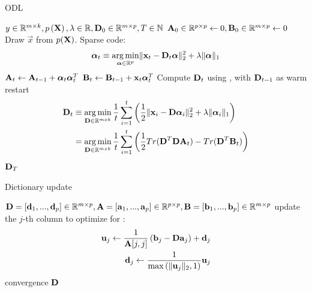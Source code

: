 \begin{algorithm}[h]
\caption{ODL}
\label{alg:trainDL}
\begin{algorithmic}[1]
\REQUIRE $y \in \mathbb{R}^{m \times k},  p \left( \boldsymbol{\mathrm{X}} \right),
\lambda \in
\mathbb{R}, \boldsymbol{\mathrm{D}}_0 \in \mathbb{R}^{m \times p}, T \in \mathbb{N}$
\STATE $\boldsymbol{\mathrm{A}}_0 \in \mathbb{R}^{p \times p} \gets  0, \boldsymbol{\mathrm{B}}_0 \in
\mathbb{R}^{m \times p}\gets 0$
\STATE Draw $\vec{x}$ from $p(\boldsymbol{\mathrm{X}})$.
\STATE Sparse code:
\begin{align*} 
\boldsymbol{\mathrm{\alpha}}_t \equiv \operatorname*{arg\,min}_{\boldsymbol{\mathrm{\alpha}}\in\mathbb{R}^{p}}  \lVert \boldsymbol{\mathrm{x}}_t
- \boldsymbol{\mathrm{D}}_t\boldsymbol{\mathrm{\alpha}} \rVert^{2}_{2}  +  \lambda \lVert \boldsymbol{\mathrm{\alpha}}
\rVert_{1}
\end{align*}
\STATE $\boldsymbol{\mathrm{A}}_t \gets \boldsymbol{\mathrm{A}}_{t-1} +
\boldsymbol{\mathrm{\alpha}}_t\boldsymbol{\mathrm{\alpha}}_t^T$\label{alg:Aupdate}
\STATE $\boldsymbol{\mathrm{B}}_t \gets \boldsymbol{\mathrm{B}}_{t-1} +
\boldsymbol{\mathrm{x}}_t\boldsymbol{\mathrm{\alpha}}_t^T$\label{alg:Bupdate}
\STATE Compute $\boldsymbol{\mathrm{D}}_t$ using , with $\boldsymbol{\mathrm{D}}_{t-1}$ as
warm restart 
\begin{equation}
\begin{split}
\boldsymbol{\mathrm{D}}_t  & \equiv \operatorname*{arg\,min}_{\boldsymbol{\mathrm{D}} \in \mathbb{R}^{m x k}}  \frac{1}{t}
\sum_{i=1}^t
\left( \frac{1}{2} \lVert \boldsymbol{\mathrm{x}}_i - \boldsymbol{\mathrm{D}}\boldsymbol{\mathrm{\alpha}}_i \rVert^{2}_{2}  + 
\lambda \lVert
\boldsymbol{\mathrm{\alpha}}_i \rVert_{1} \right) \\
& = \operatorname*{arg\,min}_{\boldsymbol{\mathrm{D}} \in \mathbb{R}^{m x k}}  \frac{1}{t} \sum_{i=1}^t
\left( \frac{1}{2} Tr(\boldsymbol{\mathrm{D}}^T\boldsymbol{\mathrm{D}}\boldsymbol{\mathrm{A}}_t) - Tr(\boldsymbol{\mathrm{D}}^T\boldsymbol{\mathrm{B}}_t)\right)
\label{eq:update}
\end{split}
\end{equation} 
\ENDFOR
\RETURN $\boldsymbol{\mathrm{D}}_T$
\end{algorithmic}
\end{algorithm}
\begin{algorithm}[h]
\caption{Dictionary update}
\label{alg:update}
\begin{algorithmic}[1]
\REQUIRE $\boldsymbol{\mathrm{D}}=[\boldsymbol{\mathrm{d}}_1,...,\boldsymbol{\mathrm{d}}_p] \in \mathbb{R}^{m \times p},
\boldsymbol{\mathrm{A}}=[\boldsymbol{\mathrm{a}}_1,...,\boldsymbol{\mathrm{a}}_p] \in \mathbb{R}^{p \times p},
\boldsymbol{\mathrm{B}}=[\boldsymbol{\mathrm{b}}_1,...,\boldsymbol{\mathrm{b}}_p] \in \mathbb{R}^{m \times p}$
\REPEAT
{}
\STATE update the $j$-th column to optimize for :
\begin{align*}
\boldsymbol{\mathrm{u}}_j \gets
\frac{1}{\boldsymbol{\mathrm{A}}[j,j]}\left(\boldsymbol{\mathrm{b}}_j-\boldsymbol{\mathrm{D}}\boldsymbol{\mathrm{a}}_j\right)+\boldsymbol{\mathrm{d}}_j \\
\boldsymbol{\mathrm{d}}_j \gets \frac{1}{\max\left(\lVert \boldsymbol{\mathrm{u}}_j \rVert_2,1\right)} \boldsymbol{\mathrm{u}}_j
\end{align*}
\ENDFOR
\UNTIL convergence 
\RETURN $\boldsymbol{\mathrm{D}}$
\end{algorithmic}
\end{algorithm}
